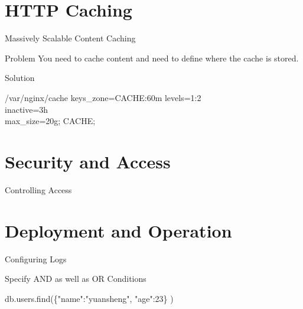 \documentclass{beamer}
\begin{document}
\section{HTTP Caching}
\begin{frame}{Massively Scalable Content Caching}
	\begin{minipage}[t]{0.8\textwidth}
	\begin{block}{Problem}
		\vspace{0.02\textheight}
		You need to cache content and need to define where the cache is stored.
	\end{block}
	
	\begin{block}{Solution}
		\vspace{0.02\textheight}
		\scriptsize
		\begin{Alms*}
			
			 	/var/nginx/cache \NI\NI
			keys\_zone=CACHE:60m
			levels=1:2 \\
			inactive=3h \\
			max\_size=20g;
			\ND\ND {} CACHE;
			
		\end{Alms*}
	\end{block}
\end{minipage}
\end{frame}



\section{Security and Access}
\begin{frame}{Controlling Access}

\end{frame}

\section{Deployment and Operation}
\begin{frame}{Configuring Logs}
	\scriptsize
	\begin{block}{Specify AND as well as OR Conditions}
		\begin{Alms*}
			db.users.find(\NI \{"name":"yuansheng", "age":23\} \ND) \\
		
		\end{Alms*}
	\end{block}
\end{frame}
\end{document}
